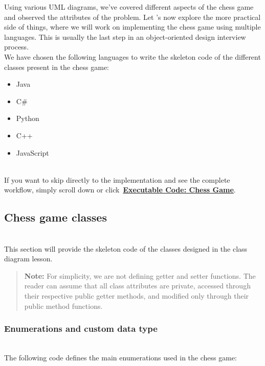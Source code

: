 

Using various UML diagrams, we've covered different aspects of the chess game and observed the attributes of the problem. Let 's now explore the more practical side of things, where we will work on implementing the chess game using multiple languages. This is usually the last step in an object-oriented design interview process.
\\
We have chosen the following languages to write the skeleton code of the different classes present in the chess game:

\begin{itemize}
\item
\protect{}\label{KEYBKkvMNI2l1YE2fDR61}
Java
\item
\protect{}\label{b9NqThYAs8XiJ_xj7w11d}
C\#
\item
\protect{}\label{IL_1Ff7sOzTQAm9eF8u8m}
Python
\item
\protect{}\label{qvMvcH4iA0DIweO60RNVS}
C++
\item
\protect{}\label{OeTtC7lCIFVUKKpxEFted}
JavaScript
\end{itemize}
\\
If you want to skip directly to the implementation and see the complete workflow, simply scroll down or click~\hyperref[Executable-code-Chess-game]{\textbf{Executable Code: Chess Game}}.

\subsection{Chess game classes}\label{yRMUPVQ6qWoy4a0V20hKk}
\\
This section will provide the skeleton code of the classes designed in the class diagram lesson.
\begin{quote}
\textbf{Note:} For simplicity, we are not defining getter and setter functions. The reader can assume that all class attributes are private, accessed through their respective public getter methods, and modified only through their public method functions.
\end{quote}
\subsubsection{Enumerations and custom data type}\label{kMNxEsllavU8i0FTWZd4w}
\\
The following code defines the main enumerations used in the chess game:

